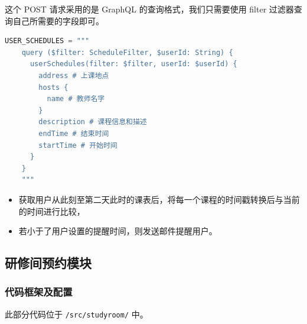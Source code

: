 \documentclass[14pt,a4paper,UTF8,twoside]{article}
\begin{document}
这个 POST 请求采用的是 GraphQL 的查询格式，我们只需要使用 filter 过滤器查询自己所需要的字段即可。

\begin{lstlisting}[language=python]
    USER_SCHEDULES = """
    query ($filter: ScheduleFilter, $userId: String) {
      userSchedules(filter: $filter, userId: $userId) {
        address # 上课地点
        hosts {
          name # 教师名字
        }
        description # 课程信息和描述
        endTime # 结束时间
        startTime # 开始时间
      }
    }
    """
\end{lstlisting}

\begin{itemize}
    \item 获取用户从此刻至第二天此时的课表后，将每一个课程的时间戳转换后与当前的时间进行比较，
    \item 若小于了用户设置的提醒时间，则发送邮件提醒用户。
\end{itemize}

\newpage{}

\subsection{研修间预约模块}

\subsubsection{代码框架及配置}

\begin{mdframed}
此部分代码位于 \texttt{/src/studyroom/} 中。
\end{mdframed}
\end{document}
